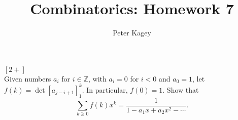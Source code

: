 \documentclass{article}
\newenvironment{problem}[2][Problem]{\begin{trivlist}
\item[\hskip \labelsep {\bfseries #1}\hskip \labelsep {\bfseries #2.}]}{\end{trivlist}}
\begin{document}
\title{Combinatorics: Homework 7}
\author{Peter Kagey}

\maketitle

\begin{problem}{21 (a)} $[2+]$ \\
  Given numbers $a_i$ for $i \in \mathbb Z$, with $a_i = 0$ for $i < 0$ and
  $a_0 = 1$, let $f(k) = \det[a_{j-i+1}]_1^k$. In particular, $f(0) = 1$. Show
  that \[
    \sum_{k \geq 0} f(k)x^k = \frac{1}{1 - a_1x + a_2x^2 - \cdots}.
  \]
\end{problem}
\end{document}
